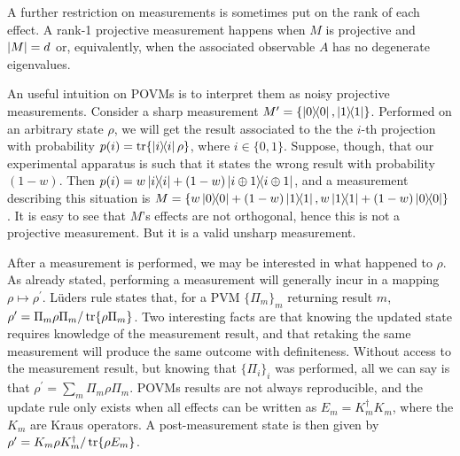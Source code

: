 		A further restriction on measurements is sometimes put on the rank of each effect. A rank-1 projective measurement happens when $M$ is projective and $\abs{M} = d$ or, equivalently, when the associated observable $A$ has no degenerate eigenvalues.
		
		An useful intuition on POVMs is to interpret them as noisy projective measurements. Consider a sharp measurement $M^\prime = \{ \ketbra{0}{0}, \ketbra{1}{1} \}$. Performed on an arbitrary state $\rho$, we will get the result associated to the the $i$-th projection with probability $p(i) = \tr{\ketbra{i}{i} \rho}$, where $i \in \{0, 1\}$. Suppose, though, that our experimental apparatus is such that it states the wrong result with probability $(1 - w)$. Then $p(i) = w \ketbra{i}{i} + (1 - w) \ketbra{i \oplus1}{i \oplus 1}$, and a measurement describing this situation is $M = \{ w \ketbra{0}{0} + (1 - w) \ketbra{1}{1}, w \ketbra{1}{1} + (1 - w) \ketbra{0}{0} \}$. It is easy to see that $M$'s effects are not orthogonal, hence this is not a projective measurement. But it is a valid unsharp measurement.
		
		After a measurement is performed, we may be interested in what happened to $\rho$. As already stated, performing a measurement will generally incur in a mapping $\rho \mapsto \rho^\prime$. Lüders rule states that, for a PVM $\{ \Pi_m \}_m$ returning result $m$, $\rho^\prime = \Pi_m \rho \Pi_m / \tr{\rho \Pi_m}$. Two interesting facts are that knowing the updated state requires knowledge of the measurement result, and that retaking the same measurement will produce the same outcome with definiteness. Without access to the measurement result, but knowing that $\{ \Pi_i \}_i$ was performed, all we can say is that $\rho^\prime = \sum_m \Pi_m \rho \Pi_m$. POVMs results are not always reproducible, and the update rule only exists when all effects can be written as $E_m = K_m^\dagger K_m$, where the $K_m$ are Kraus operators. A post-measurement state is then given by $\rho^\prime = K_m \rho K_m^\dagger / \tr{\rho E_m}$.
		
